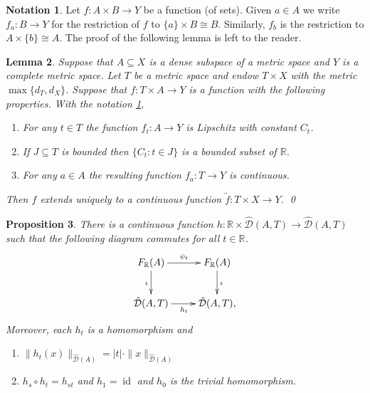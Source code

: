 \documentclass[12pt]{amsart}
\newtheorem{prop}{Proposition}[section]
\newtheorem{lemma}[prop]{Lemma}
\theoremstyle{definition}
\newtheorem{notation}[prop]{Notation}
\def\RR{\ensuremath{\mathbb{R}}}
\def\id{\operatorname{id}}
\def\D{\mathcal{D}}
\def\tD{\hat{\D}}
\begin{document}
\begin{notation}\label{nota:f_t}
Let $f \colon A \times B \to Y$ be a function (of sets).
Given $a \in A$ we write $f_a \colon B \to Y$ for the restriction of $f$ to $\{a\} \times B \cong B$.
Similarly, $f_b$ is the restriction to $A \times \{b\} \cong A$. The proof of the following
lemma is left to the reader.
\end{notation}

\begin{lemma}\label{L:extend homotpy from dense subspace}
Suppose that $A \subseteq X$ is a dense subspace of a metric space and $Y$ is a complete metric space.
Let $T$ be a metric space and endow $T \times X$ with the metric $\max\{d_T,d_X\}$.
Suppose that $f \colon T \times A \to Y$ is a function with the following properties.
With the notation \ref{nota:f_t},
\begin{enumerate}[label=(\roman*)]
\item \label{L:extend homotopy:Lipschitz fibre}
For any $t \in T$ the function $f_t \colon A \to Y$ is Lipschitz with constant $C_t$.

\item \label{L:extend homotopy:continuous bounded}
If $J \subseteq T$ is bounded then $\{C_t : t \in J\}$ is a bounded subset of $\RR$.

\item \label{L:extend homotopy:continuous fa}
For any $a \in A$ the resulting function $f_a \colon T \to Y$ is continuous.
\end{enumerate}
Then $f$ extends uniquely to a continuous function $\tilde{f} \colon T \times X \to Y$.
\qed
\end{lemma}





\begin{prop}\label{P:extend psi_t to D}
There is a continuous function $h \colon \RR \times \tD(A,T) \to \tD(A,T)$ such that the following diagram commutes for all $t \in \RR$.
\[
\xymatrix{
{F_\RR(A)} \ar[r]^{\psi_t} \ar[d]_{\iota} &
{F_\RR(A)} \ar[d]^{\iota} \\
\tD(A,T) \ar[r]_{h_t} & \tD(A,T),
}
\]
Moreover, each $h_t$ is a homomorphism and
\begin{enumerate}[label=(\roman*)]
\item\label{P:extend psi_t to D:Lip}
$\|h_t(x)\|_{\tD(A)}= |t| \cdot \|x\|_{\tD(A)}$ 

\item\label{P:extend psi_t to D:nat} 
$h_s \circ h_t=h_{st}$ and $h_1=\id$ and $h_0$ is the trivial homomorphism.
\end{enumerate}
\end{prop}
\end{document}
